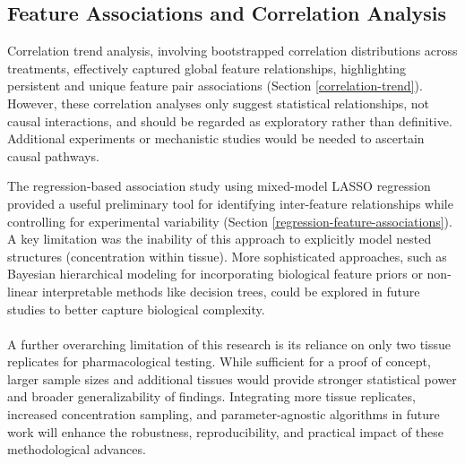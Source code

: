 \documentclass{report}
\begin{document}
    \subsection{Feature Associations and Correlation Analysis}
    Correlation trend analysis, involving bootstrapped correlation distributions across treatments, effectively captured global feature relationships, highlighting persistent and unique feature pair associations (Section \ref{correlation-trend}). However, these correlation analyses only suggest statistical relationships, not causal interactions, and should be regarded as exploratory rather than definitive. Additional experiments or mechanistic studies would be needed to ascertain causal pathways.
    
    The regression-based association study using mixed-model LASSO regression provided a useful preliminary tool for identifying inter-feature relationships while controlling for experimental variability (Section \ref{regression-feature-associations}). A key limitation was the inability of this approach to explicitly model nested structures (concentration within tissue). More sophisticated approaches, such as Bayesian hierarchical modeling for incorporating biological feature priors or non-linear interpretable methods like decision trees, could be explored in future studies to better capture biological complexity.
    
    \paragraph{}
    A further overarching limitation of this research is its reliance on only two tissue replicates for pharmacological testing. While sufficient for a proof of concept, larger sample sizes and additional tissues would provide stronger statistical power and broader generalizability of findings. Integrating more tissue replicates, increased concentration sampling, and parameter-agnostic algorithms in future work will enhance the robustness, reproducibility, and practical impact of these methodological advances.
\end{document}
